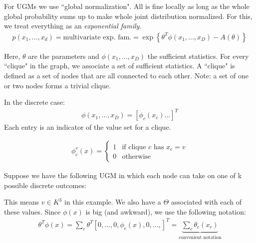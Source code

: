 \documentclass{article}
\begin{document}
For UGMs we use ``global normalization". All is fine locally as long as the whole global probability sums up to make whole joint distribution normalized.
For this, we treat everything as an \emph{exponential family}.
\begin{align}
p(x_1, ..., x_d) = \text{multivariate exp. fam.} = \exp\left\{ \theta^T \phi(x_1, ..., x_D) - A(\theta) \right\}
\end{align}

Here, $\theta$ are the parameters and $\phi(x_1, ..., x_D)$ the sufficient statistics.
For every ``clique" in the graph, we associate a set of sufficient statistics. A ``clique" is defined as a set of nodes that are all connected to each other. Note: a set of one or two nodes forms a trivial clique.
\smallskip

In the discrete case:
\begin{align}
\phi(x_1, ..., x_D) = [ \phi_c(x_c) ...]^T
\end{align}
Each entry is an indicator of the value set for a clique. 

\begin{align}
\phi_c^v(x) = 
\begin{cases}
1 &\text{if clique } c \text{ has } x_c=v \\
0 &\text{otherwise}
\end{cases}
\end{align}

Suppose we have the following UGM in which each node can take on one of k possible discrete outcomes:
\begin{center}
\end{center}
\smallskip

This means $ v \in K^3 $ in this example.
We also have a $\Theta$ associated with each of these values.
Since $\phi(x)$ is big (and awkward), we use the following notation:
\begin{align}
\theta^T \phi(x) = \sum_c \theta^T [0, ..., 0, \phi_c(x), 0, ...,]^T = \underbrace{\sum_c \theta_c(x_c)}_{\text{convenient notation}}
\end{align}
\end{document}

